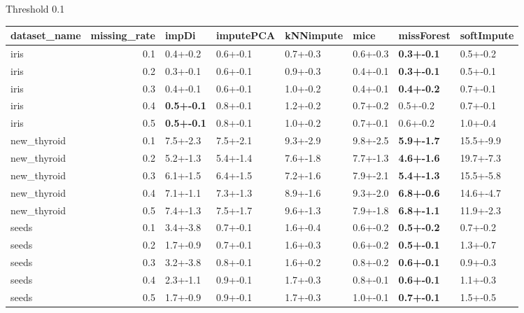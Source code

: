  Threshold 0.1 
 \begin{tabular}{lrllllll}
\toprule
dataset_name &  missing_rate &             impDi & imputePCA & kNNimpute &     mice &        missForest & softImpute \\
\midrule
        iris &           0.1 &          0.4+-0.2 &  0.6+-0.1 &  0.7+-0.3 & 0.6+-0.3 & \textbf{0.3+-0.1} &   0.5+-0.2 \\
        iris &           0.2 &          0.3+-0.1 &  0.6+-0.1 &  0.9+-0.3 & 0.4+-0.1 & \textbf{0.3+-0.1} &   0.5+-0.1 \\
        iris &           0.3 &          0.4+-0.1 &  0.6+-0.1 &  1.0+-0.2 & 0.4+-0.1 & \textbf{0.4+-0.2} &   0.7+-0.1 \\
        iris &           0.4 & \textbf{0.5+-0.1} &  0.8+-0.1 &  1.2+-0.2 & 0.7+-0.2 &          0.5+-0.2 &   0.7+-0.1 \\
        iris &           0.5 & \textbf{0.5+-0.1} &  0.8+-0.1 &  1.0+-0.2 & 0.7+-0.1 &          0.6+-0.2 &   1.0+-0.4 \\
 new_thyroid &           0.1 &          7.5+-2.3 &  7.5+-2.1 &  9.3+-2.9 & 9.8+-2.5 & \textbf{5.9+-1.7} &  15.5+-9.9 \\
 new_thyroid &           0.2 &          5.2+-1.3 &  5.4+-1.4 &  7.6+-1.8 & 7.7+-1.3 & \textbf{4.6+-1.6} &  19.7+-7.3 \\
 new_thyroid &           0.3 &          6.1+-1.5 &  6.4+-1.5 &  7.2+-1.6 & 7.9+-2.1 & \textbf{5.4+-1.3} &  15.5+-5.8 \\
 new_thyroid &           0.4 &          7.1+-1.1 &  7.3+-1.3 &  8.9+-1.6 & 9.3+-2.0 & \textbf{6.8+-0.6} &  14.6+-4.7 \\
 new_thyroid &           0.5 &          7.4+-1.3 &  7.5+-1.7 &  9.6+-1.3 & 7.9+-1.8 & \textbf{6.8+-1.1} &  11.9+-2.3 \\
       seeds &           0.1 &          3.4+-3.8 &  0.7+-0.1 &  1.6+-0.4 & 0.6+-0.2 & \textbf{0.5+-0.2} &   0.7+-0.2 \\
       seeds &           0.2 &          1.7+-0.9 &  0.7+-0.1 &  1.6+-0.3 & 0.6+-0.2 & \textbf{0.5+-0.1} &   1.3+-0.7 \\
       seeds &           0.3 &          3.2+-3.8 &  0.8+-0.1 &  1.6+-0.2 & 0.8+-0.2 & \textbf{0.6+-0.1} &   0.9+-0.3 \\
       seeds &           0.4 &          2.3+-1.1 &  0.9+-0.1 &  1.7+-0.3 & 0.8+-0.1 & \textbf{0.6+-0.1} &   1.1+-0.3 \\
       seeds &           0.5 &          1.7+-0.9 &  0.9+-0.1 &  1.7+-0.3 & 1.0+-0.1 & \textbf{0.7+-0.1} &   1.5+-0.5 \\
\bottomrule
\end{tabular}




